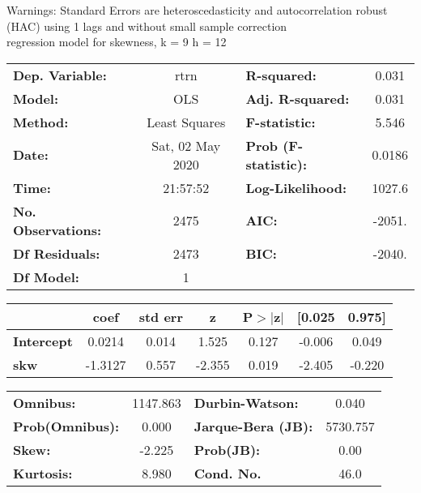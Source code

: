 Warnings: \newline
 [1] Standard Errors are heteroscedasticity and autocorrelation robust (HAC) using 1 lags and without small sample correction\\ 

regression model for skewness, k = 9 h = 12\begin{center}
\begin{tabular}{lclc}
\toprule
\textbf{Dep. Variable:}    &       rtrn       & \textbf{  R-squared:         } &     0.031   \\
\textbf{Model:}            &       OLS        & \textbf{  Adj. R-squared:    } &     0.031   \\
\textbf{Method:}           &  Least Squares   & \textbf{  F-statistic:       } &     5.546   \\
\textbf{Date:}             & Sat, 02 May 2020 & \textbf{  Prob (F-statistic):} &   0.0186    \\
\textbf{Time:}             &     21:57:52     & \textbf{  Log-Likelihood:    } &    1027.6   \\
\textbf{No. Observations:} &        2475      & \textbf{  AIC:               } &    -2051.   \\
\textbf{Df Residuals:}     &        2473      & \textbf{  BIC:               } &    -2040.   \\
\textbf{Df Model:}         &           1      & \textbf{                     } &             \\
\bottomrule
\end{tabular}
\begin{tabular}{lcccccc}
                   & \textbf{coef} & \textbf{std err} & \textbf{z} & \textbf{P$> |$z$|$} & \textbf{[0.025} & \textbf{0.975]}  \\
\midrule
\textbf{Intercept} &       0.0214  &        0.014     &     1.525  &         0.127        &       -0.006    &        0.049     \\
\textbf{skw}       &      -1.3127  &        0.557     &    -2.355  &         0.019        &       -2.405    &       -0.220     \\
\bottomrule
\end{tabular}
\begin{tabular}{lclc}
\textbf{Omnibus:}       & 1147.863 & \textbf{  Durbin-Watson:     } &    0.040  \\
\textbf{Prob(Omnibus):} &   0.000  & \textbf{  Jarque-Bera (JB):  } & 5730.757  \\
\textbf{Skew:}          &  -2.225  & \textbf{  Prob(JB):          } &     0.00  \\
\textbf{Kurtosis:}      &   8.980  & \textbf{  Cond. No.          } &     46.0  \\
\bottomrule
\end{tabular}
\end{center}

